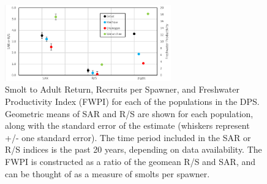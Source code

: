\documentclass[
  letterpaper,
  oneside,
  open=any]{scrbook}
\begin{document}
\begin{figure}

{\centering \includegraphics[width=2.82in,height=\textheight]{content/Interior_Columbia/../../media/image20.png}

}

\caption{\label{fig-UC-Spr-Chinook-Smolt-to-Adult-Productivity}Smolt to
Adult Return, Recruits per Spawner, and Freshwater Productivity Index
(FWPI) for each of the populations in the DPS. Geometric means of SAR
and R/S are shown for each population, along with the standard error of
the estimate (whiskers represent +/- one standard error). The time
period included in the SAR or R/S indices is the past 20 years,
depending on data availability. The FWPI is constructed as a ratio of
the geomean R/S and SAR, and can be thought of as a measure of smolts
per spawner.}

\end{figure}
\end{document}
